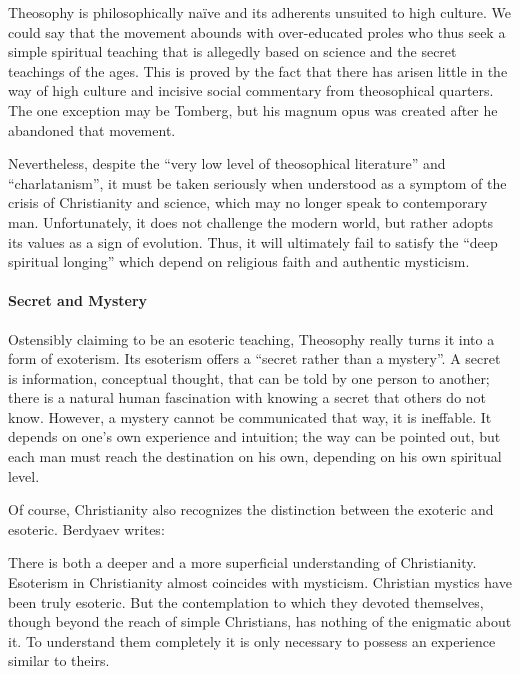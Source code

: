 Theosophy is philosophically naïve and its adherents unsuited to high culture. We could say that the movement abounds with over-educated proles who thus seek a simple spiritual teaching that is allegedly based on science and the secret teachings of the ages. This is proved by the fact that there has arisen little in the way of high culture and incisive social commentary from theosophical quarters. The one exception may be Tomberg, but his magnum opus was created after he abandoned that movement.

Nevertheless, despite the ``very low level of theosophical literature'' and ``charlatanism'', it must be taken seriously when understood as a symptom of the crisis of Christianity and science, which may no longer speak to contemporary man. Unfortunately, it does not challenge the modern world, but rather adopts its values as a sign of evolution. Thus, it will ultimately fail to satisfy the ``deep spiritual longing'' which depend on religious faith and authentic mysticism.

\paragraph{Secret and Mystery}


Ostensibly claiming to be an esoteric teaching, Theosophy really turns it into a form of exoterism. Its esoterism offers a ``secret rather than a mystery''. A secret is information, conceptual thought, that can be told by one person to another; there is a natural human fascination with knowing a secret that others do not know. However, a mystery cannot be communicated that way, it is ineffable. It depends on one's own experience and intuition; the way can be pointed out, but each man must reach the destination on his own, depending on his own spiritual level.

Of course, Christianity also recognizes the distinction between the exoteric and esoteric. Berdyaev writes:

\begin{quotex}
There is both a deeper and a more superficial understanding of Christianity. Esoterism in Christianity almost coincides with mysticism. Christian mystics have been truly esoteric. But the contemplation to which they devoted themselves, though beyond the reach of simple Christians, has nothing of the enigmatic about it. To understand them completely it is only necessary to possess an experience similar to theirs.
\end{quotex}


